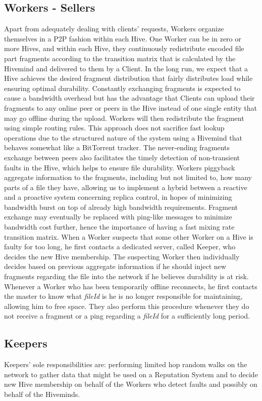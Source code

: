 \documentclass[runningheads]{llncs}
\begin{document}
\subsection{Workers - Sellers}
Apart from adequately dealing with clients' requests, Workers organize themselves in a P2P fashion within each Hive. One Worker can be in zero or more Hives, and within each Hive, they continuously redistribute encoded file part fragments according to the transition matrix that is calculated by the Hivemind and delivered to them by a Client. In the long run, we expect that a Hive achieves the desired fragment distribution that fairly distributes load while ensuring optimal durability. Constantly exchanging fragments is expected to cause a bandwidth overhead but has the advantage that Clients can upload their fragments to any online peer or peers in the Hive instead of one single entity that may go offline during the upload. Workers will then redistribute the fragment using simple routing rules. This approach does not sacrifice fast lookup operations due to the structured nature of the system using a Hivemind that behaves somewhat like a BitTorrent tracker. The never-ending fragments exchange between peers also facilitates the timely detection of non-transient faults in the Hive, which helps to ensure file durability. Workers piggyback aggregate information to the fragments, including but not limited to, how many parts of a file they have, allowing us to implement a hybrid between a reactive and a proactive system concerning replica control, in hopes of minimizing bandwidth burst on top of already high bandwidth requirements. Fragment exchange may eventually be replaced with ping-like messages to minimize bandwidth cost further, hence the importance of having a fast mixing rate transition matrix. When a Worker suspects that some other Worker on a Hive is faulty for too long, he first contacts a dedicated server, called Keeper, who decides the new Hive membership. The suspecting Worker then individually decides based on previous aggregate information if he should inject new fragments regarding the file into the network if he believes durability is at risk. Whenever a Worker who has been temporarily offline reconnects, he first contacts the master to know what \textit{fileId} is he is no longer responsible for maintaining, allowing him to free space. They also perform this procedure whenever they do not receive a fragment or a ping regarding a \textit{fileId} for a sufficiently long period.

\subsection{Keepers}
Keepers' sole responsibilities are: performing limited hop random walks on the network to gather data that might be used on a Reputation System and to decide new Hive membership on behalf of the Workers who detect faults and possibly on behalf of the Hiveminds.
\end{document}

